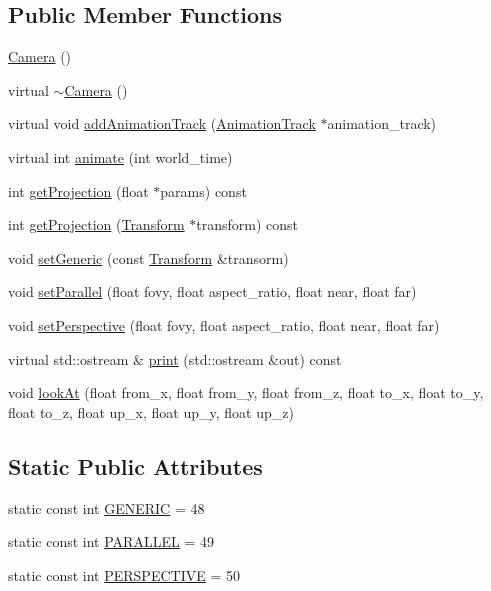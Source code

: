 \subsection*{Public Member Functions}
\begin{CompactItemize}
\item 
\hyperlink{classm3g_1_1Camera_a3f3efcb2fcc75de885df29041103cd2}{Camera} ()
\item 
virtual \hyperlink{classm3g_1_1Camera_b921e886e6f14e117eb8099ccb0a3775}{$\sim$Camera} ()
\item 
virtual void \hyperlink{classm3g_1_1Camera_415c0b110f95410ded9b85e5d99a496b}{addAnimationTrack} (\hyperlink{classm3g_1_1AnimationTrack}{AnimationTrack} $\ast$animation\_\-track)
\item 
virtual int \hyperlink{classm3g_1_1Camera_8aad1ceab4c2a03609c8a42324ce484d}{animate} (int world\_\-time)
\item 
int \hyperlink{classm3g_1_1Camera_a2ebe46a4e16fee86d4f547588411302}{getProjection} (float $\ast$params) const 
\item 
int \hyperlink{classm3g_1_1Camera_9e0c204df146342990703acb744954b1}{getProjection} (\hyperlink{classm3g_1_1Transform}{Transform} $\ast$transform) const 
\item 
void \hyperlink{classm3g_1_1Camera_51c42821097e90d3f59e87676684f60a}{setGeneric} (const \hyperlink{classm3g_1_1Transform}{Transform} \&transorm)
\item 
void \hyperlink{classm3g_1_1Camera_88ecc1c18e2d785ca9638e0bec6c5ce2}{setParallel} (float fovy, float aspect\_\-ratio, float near, float far)
\item 
void \hyperlink{classm3g_1_1Camera_ca92a48ebe3424deac8e54c27550189d}{setPerspective} (float fovy, float aspect\_\-ratio, float near, float far)
\item 
virtual std::ostream \& \hyperlink{classm3g_1_1Camera_6fea17fa1532df3794f8cb39cb4f911f}{print} (std::ostream \&out) const 
\item 
void \hyperlink{classm3g_1_1Camera_0006b18ae0e27a031d533e987b9756a8}{lookAt} (float from\_\-x, float from\_\-y, float from\_\-z, float to\_\-x, float to\_\-y, float to\_\-z, float up\_\-x, float up\_\-y, float up\_\-z)
\end{CompactItemize}
\subsection*{Static Public Attributes}
\begin{CompactItemize}
\item 
static const int \hyperlink{classm3g_1_1Camera_48a4e153c97a1f4890558a77dfe02ca4}{GENERIC} = 48
\item 
static const int \hyperlink{classm3g_1_1Camera_d9630da0e9505afbb107c86229aa2f08}{PARALLEL} = 49
\item 
static const int \hyperlink{classm3g_1_1Camera_e62e72bde93e7d7ceb482e7a8c40dcf5}{PERSPECTIVE} = 50
\end{CompactItemize}
